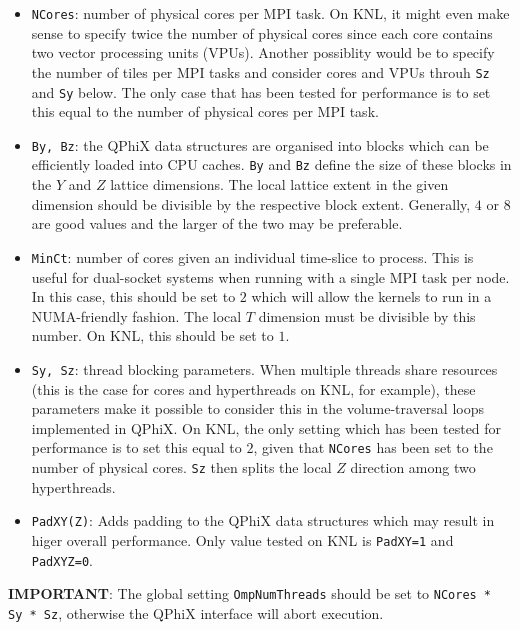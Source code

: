 \begin{itemize}
  \item{\texttt{NCores}: number of physical cores per MPI task. On KNL, it might even make sense to specify twice the number of physical cores since each core contains two vector processing units (VPUs). Another possiblity would be to specify the number of tiles per MPI tasks and consider cores and VPUs throuh \texttt{Sz} and \texttt{Sy} below. The only case that has been tested for performance is to set this equal to the number of physical cores per MPI task.}
  \item{\texttt{By, Bz}: the QPhiX data structures are organised into blocks which can be efficiently loaded into CPU caches. \texttt{By} and \texttt{Bz} define the size of these blocks in the $Y$ and $Z$ lattice dimensions. The local lattice extent in the given dimension should be divisible by the respective block extent. Generally, $4$ or $8$ are good values and the larger of the two may be preferable.}
  \item{\texttt{MinCt}: number of cores given an individual time-slice to process. This is useful for dual-socket systems when running with a single MPI task per node. In this case, this should be set to $2$ which will allow the kernels to run in a NUMA-friendly fashion. The local $T$ dimension must be divisible by this number. On KNL, this should be set to $1$.}
  \item{\texttt{Sy, Sz}: thread blocking parameters. When multiple threads share resources (this is the case for cores and hyperthreads on KNL, for example), these parameters make it possible to consider this in the volume-traversal loops implemented in QPhiX. On KNL, the only setting which has been tested for performance is to set this equal to $2$, given that \texttt{NCores} has been set to the number of physical cores. \texttt{Sz} then splits the local $Z$ direction among two hyperthreads.}
  \item{\texttt{PadXY(Z)}: Adds padding to the QPhiX data structures which may result in higer overall performance. Only value tested on KNL is \texttt{PadXY=1} and \texttt{PadXYZ=0}.}
\end{itemize}

\noindent\textbf{IMPORTANT}: The global setting \texttt{OmpNumThreads} should be set to \texttt{NCores * Sy * Sz}, otherwise the QPhiX interface will abort execution.

